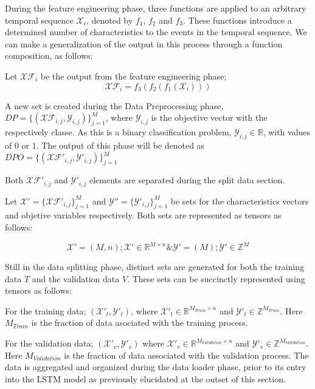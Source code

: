 \documentclass{article}
\begin{document}
During the feature engineering phase, three functions are applied to an arbitrary temporal sequence $\mathcal{X}_i$, denoted by $f_1$, $f_2$ and $f_3$. These functions introduce a determined number of characteristics to the events in the temporal sequence. We can make a generalization of the output in this process through a function composition, as follows:


Let $\mathcal{XF}_i$ be the output from the feature engineering phase;
\begin{equation*}
  \mathcal{XF}_i = f_3(f_2(f_1(\mathcal{X}_i)))
\end{equation*}

A new set is created during the Data Preprocessing phase, $DP = \{ (\mathcal{XF}_{i,j},\mathcal{Y}_{i,j}) \}_{j=1}^M$, where $\mathcal{Y}_{i,j}$ is the objective vector with the respectively classe. As this is a binary classification problem, $\mathcal{Y}_{i,j} \in \mathds{R}$, with values of $0$ or $1$. The output of this phase will be denoted as $DPO = \{ (\mathcal{XF}'_{i,j},\mathcal{Y}'_{i,j}) \}_{j=1}^M$

Both $\mathcal{XF}'_{i,j}$ and $\mathcal{Y}'_{i,j}$ elements are separated during the split data section.

Let $\mathcal{X}' = \{ \mathcal{XF}'_{i,j} \}_{j=1}^M$ and $\mathcal{Y}'' = \{ \mathcal{Y}'_{i,j} \}_{j=1}^M$ be sets for the characteristics vectors and objetive variables respectively. Both sets are represented as tensors as follows:

\begin{equation*}
  \mathcal{X}' = (M,n); \mathcal{X}' \in \mathds{R}^{M \times n} \& \mathcal{Y}' = (M); \mathcal{Y}' \in \mathds{Z}^M
\end{equation*}

Still in the data splitting phase, distinct sets are generated for both the training data $T$ and the validation data $V$. These sets can be succinctly represented using tensors as follows:

For the training data; $(\mathcal{X}'_t,\mathcal{Y}'_t)$, where $\mathcal{X}'_t \in \mathds{R}^{M_{Train}\times n}$ and $\mathcal{Y}'_t \in \mathds{Z}^{M_{Train}}$. Here $M_{Train}$ is the fraction of data asociated with the training process.

For the validation data; $(\mathcal{X}'_v, \mathcal{Y}'_v)$ where $\mathcal{X}'_v \in \mathds{R}^{M_{Validation} \times n}$ and $\mathcal{Y}'_v \in \mathds{Z}^{M_{Validation}}$. Here $M_{Validation}$ is the fraction of data associated with the validation process. The data is aggregated and organized during the data loader phase, prior to its entry into the LSTM model as previously elucidated at the outset of this section.
\end{document}
